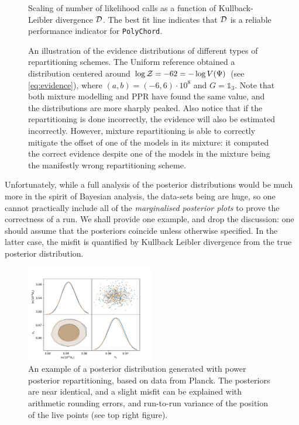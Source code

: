 \documentclass[usenatbib]{mnras}
\begin{document}
\begin{figure}
  
\caption{Scaling of number of likelihood calls as a function of Kullback-Leibler divergence \({\cal D}\). The best fit line indicates that \({\cal D}\) is a reliable performance indicator for \texttt{PolyChord}.\label{fig:kl-scaling}}
\end{figure}


\begin{figure}

\caption{An illustration of the evidence distributions of different types of repartitioning schemes. The Uniform reference obtained a distribution centered around \(\log {\cal Z} = -62 = - \log V(\Psi)\) (see \cref{eq:evidence}), where \((a,b)=(-6, 6)\cdot 10^{8}\) and \(G=\mathds{1}_{3}\). Note that both mixture modelling and PPR have found the same value, and the distributions are more sharply peaked. Also notice that if the repartitioning is done incorrectly, the evidence will also be estimated incorrectly. However, mixture repartitioning is able to correctly mitigate the offset of one of the models in its mixture: it computed the correct evidence despite one of the models in the mixture being the manifestly wrong repartitioning scheme.\label{fig:hist}}
\end{figure}

Unfortunately, while a full analysis of the posterior distributions
would be much more in the spirit of Bayesian analysis, the data-sets
being are huge, so one cannot practically include all of the
\emph{marginalised posterior plots} to prove the correctness of a
run. We shall provide one example, and drop the discussion: one should
assume that the posteriors coincide unless otherwise specified. In the
latter case, the misfit is quantified by Kullback Leibler divergence
from the true posterior distribution.


\begin{figure}
  \includegraphics[width=0.5\textwidth]{./illustrations/triangle-fit.pdf}
\caption{An example of a posterior distribution generated with power posterior repartitioning, based on data from Planck. The posteriors are near identical, and a slight misfit can be explained with arithmetic rounding errors, and run-to-run variance of the position of the live points (see top right figure).\label{fig:overlay-posteriors}}
\end{figure}
\end{document}
